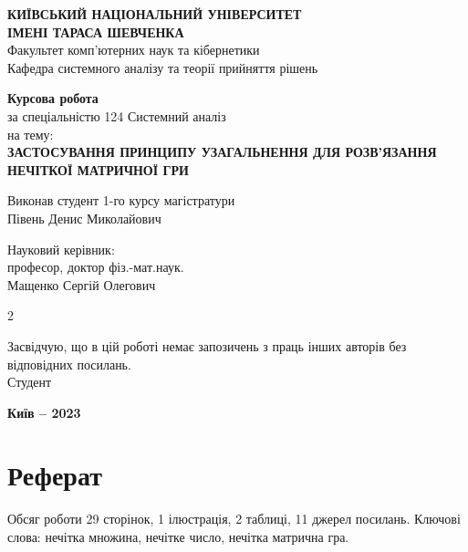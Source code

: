 \documentclass[14pt, a4paper, oneside]{extarticle}
\numberwithin{equation}{section}
\begin{document}
\begin{center}
\textbf{КИЇВСЬКИЙ НАЦІОНАЛЬНИЙ УНІВЕРСИТЕТ\\ ІМЕНІ ТАРАСА ШЕВЧЕНКА}\\ 
Факультет комп’ютерних наук та кібернетики\\
Кафедра системного аналізу та теорії прийняття рішень\\

\vfill

\textbf{Курсова робота}\\
за спеціальністю 124 Системний аналіз\\
на тему:\\
\textbf{ЗАСТОСУВАННЯ ПРИНЦИПУ УЗАГАЛЬНЕННЯ ДЛЯ РОЗВ'ЯЗАННЯ НЕЧІТКОЇ МАТРИЧНОЇ ГРИ}\\

\end{center}
\vfill

\begin{flushleft}
Виконав студент 1-го курсу магістратури\\
Півень Денис Миколайович \hfill \underline{\hspace{3cm}}\\
\end{flushleft}

\begin{flushleft}
Науковий керівник:\\
професор, доктор фіз.-мат.наук.\\
Мащенко Сергій Олегович \hfill \underline{\hspace{3cm}}
\end{flushleft}

\vfill

\begin{multicols}{2}
  \hspace{1mm}

  \columnbreak
    Засвідчую, що в цій роботі немає запозичень з праць інших авторів без відповідних посилань.
    \\
    Студент \hfill \underline{\hspace{3cm}}
  
\end{multicols}

\vfill

\centerline{\textbf{Київ – 2023}}

\section*{Реферат}
Обсяг роботи 29 сторінок, 1 ілюстрація, 2 таблиці, 11 джерел посилань.
Ключові слова: нечітка множина, нечітке число, нечітка матрична гра.
\end{document}
